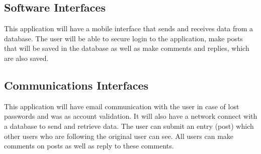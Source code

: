 \documentclass[letterpaper, 10, draftclsnofoot, onecolumn]{IEEEtran}
\begin{document}
\subsection{Software Interfaces}
This application will have a mobile interface that sends and receives data from a database. The user will be able to secure login to the application, make posts that will be saved in the database as well as make comments and replies, which are also saved. 


\subsection{Communications Interfaces}
This application will have email communication with the user in case of lost passwords and was as account validation. It will also have a network connect with a database to send and retrieve data. The user can submit an entry (post) which other users who are following the original user can see. All users can make comments on posts as well as reply to these comments. 




\end{document}
